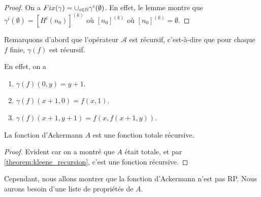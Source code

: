 \ifdefined\outputproof
\begin{proof}
	On a $Fix(\gamma) = \cup_{i \in \mathbb{N}} \gamma^{i}(\emptyset)$.
	En effet, le lemme montre que $\gamma^{i}(\emptyset) = [H^{i}(n_{0})]^{(k)}$
	où $[n_{0}]^{(k)}$ où $[n_{0}]^{(k)} = \emptyset$.
\end{proof}
\fi

Remarquons d'abord que l'opérateur $\mathcal{A}$ est
récursif, c'est-à-dire que pour chaque $f$ finie, $\gamma(f)$ est récursif.

En effet, on a
\begin{enumerate}
	\item $\gamma(f)(0, y) = y + 1$.
	\item $\gamma(f)(x + 1, 0) = f(x, 1)$.
	\item $\gamma(f)(x + 1, y + 1) = f(x, f(x + 1, y))$.
\end{enumerate}

\begin{corollary}
	\label{corollary:ackermann_total_recursive}
	La fonction d'Ackermann $A$ est une fonction totale récursive.
\end{corollary}

\ifdefined\outputproof
\begin{proof}
	Evident car on a montré que $A$ était totale, et par
	\ref{theorem:kleene_recursion}, c'est une fonction récursive.
\end{proof}
\fi

Cependant, nous allons montrer que la fonction d'Ackermann n'est pas RP. Nous
aurons besoin d'une liste de propriétés de $A$.

